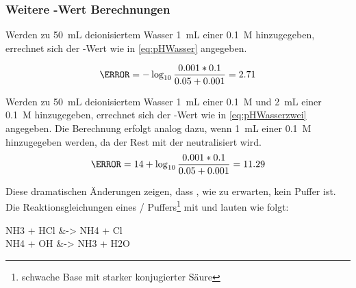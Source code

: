 \documentclass{article}
\begin{document}
      \pagebreak
      
      \subsubsection{Weitere \pH-Wert Berechnungen} \label{sec:weitereBerechnungen}
      
        Werden zu \SI[mode=text]{50}{\milli\liter} deionisiertem Wasser \SI[mode=text]{1}{\milli\liter} einer \SI[mode=text]{0.1}{M}  hinzugegeben, errechnet sich der \pH-Wert wie in \eqref{eq:pHWasser} angegeben.
        
        \begin{equation}
          \pH = -\log _{10} \frac{0.001 * 0.1}{0.05 + 0.001} = 2.71 \label{eq:pHWasser}
        \end{equation}
        
        Werden zu \SI[mode=text]{50}{\milli\liter} deionisiertem Wasser \SI[mode=text]{1}{\milli\liter} einer \SI[mode=text]{0.1}{M}  und \SI[mode=text]{2}{\milli\liter} einer \SI[mode=text]{0.1}{M}  hinzugegeben, errechnet sich der \pH-Wert wie in \eqref{eq:pHWasserzwei} angegeben. Die Berechnung erfolgt analog dazu, wenn \SI[mode=text]{1}{\milli\liter} einer \SI[mode=text]{0.1}{M}  hinzugegeben werden, da der Rest mit der  neutralisiert wird.\\
        
        \begin{equation}
          \pH = 14 + \log _{10} \frac{0.001 * 0.1}{0.05 + 0.001} = 11.29 \label{eq:pHWasserzwei}
        \end{equation}
        
        Diese dramatischen Änderungen zeigen, dass , wie zu erwarten, kein Puffer ist. \\
        
        Die Reaktionsgleichungen eines / Puffers\footnote{schwache Base mit starker konjugierter Säure} mit  und  lauten wie folgt:
        
        \begin{reactions}
          NH3\aq{} + HCl\aq{} &-> NH4\pch\aq{} + Cl\mch\aq{} \\
          NH4\pch\aq{} + OH\mch\aq{} &-> NH3\aq{} + H2O
        \end{reactions}
        
  \pagebreak
  
  \listofreactions
  \printbibliography[title=Literaturverzeichnis]
  \listoftables
  
\end{document}
